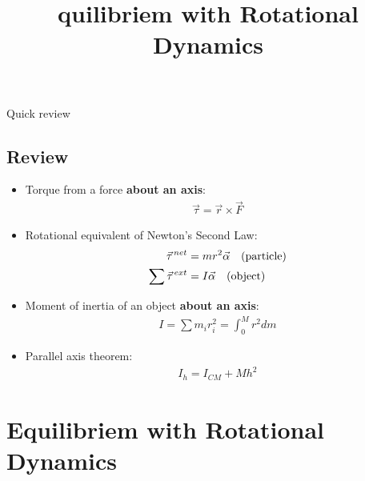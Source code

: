 \documentclass[aspectratio=169,
hyperref={colorlinks,urlcolor=blue}
]{beamer}
\begin{document}
\begin{frame}{Quick review}
\subsection{Review}
\label{subsec:review}
\begin{itemize}
\item Torque from a force \textbf{about an axis}:
\begin{align*}
\vec \tau =\vec r \times \vec F
\end{align*}
\item Rotational equivalent of Newton's Second Law:
\begin{align*}
\pvec \tau^{net}&=mr^2\vec \alpha\quad \text{(particle)}\\
\sum \pvec \tau^{ext}&=I\vec \alpha\quad \text{(object)}
\end{align*}
\item Moment of inertia of an object \textbf{about an axis}:
\begin{align*}
I=\sum m_ir_i^2  =\int_0^M r^2 dm
\end{align*}
\item Parallel axis theorem:
\begin{align*}
I_h=I_{CM}+Mh^2
\end{align*}
\end{itemize}
\end{frame}









\section{Equilibriem with Rotational Dynamics}
\label{sec:equilibirem}
\title{quilibriem with Rotational Dynamics}
\author{\insertsubsection}


\begin{frame}
\titlepage
\thispagestyle{empty}
\end{frame}






\end{document}
